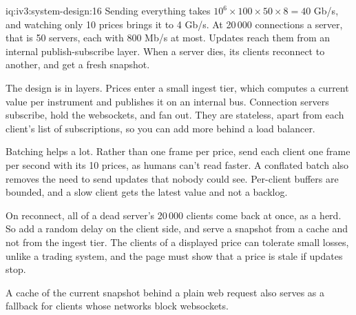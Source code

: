 \begin{solution}{iq:iv3:system-design:16}
Sending everything takes $10^6 \times 100 \times 50 \times 8 = 40$ Gb/s, and watching only 10 prices brings it to 4 Gb/s. At 20\,000 connections a server, that is 50 servers, each with 800 Mb/s at most. Updates reach them from an internal publish-subscribe layer. When a server dies, its clients reconnect to another, and get a fresh snapshot.

The design is in layers. Prices enter a small ingest tier, which computes a current value per instrument and publishes it on an internal bus. Connection servers subscribe, hold the websockets, and fan out. They are stateless, apart from each client's list of subscriptions, so you can add more behind a load balancer.

Batching helps a lot. Rather than one frame per price, send each client one frame per second with its 10 prices, as humans can't read faster. A conflated batch also removes the need to send updates that nobody could see. Per-client buffers are bounded, and a slow client gets the latest value and not a backlog.

On reconnect, all of a dead server's 20\,000 clients come back at once, as a herd. So add a random delay on the client side, and serve a snapshot from a cache and not from the ingest tier. The clients of a displayed price can tolerate small losses, unlike a trading system, and the page must show that a price is stale if updates stop.

A cache of the current snapshot behind a plain web request also serves as a fallback for clients whose networks block websockets.

\end{solution}

